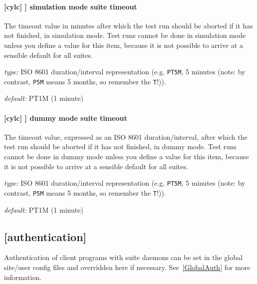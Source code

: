 \paragraph[simulation mode suite timeout]{[cylc] \textrightarrow [[reference test]] \textrightarrow simulation mode suite timeout}

The timeout value in minutes after which the test run should be aborted
if it has not finished, in simulation mode. Test runs cannot be done in
simulation mode unless you define a value for this item, because it is
not possible to arrive at a sensible default for all suites.

\begin{myitemize}
    \item {\em type:} ISO 8601 duration/interval representation (e.g.
 \lstinline=PT5M=, 5 minutes (note: by contrast, \lstinline=P5M= means 5
 months, so remember the \lstinline=T=!)).
    \item {\em default:} PT1M (1 minute)
\end{myitemize}

\paragraph[dummy mode suite timeout]{[cylc] \textrightarrow [[reference test]] \textrightarrow dummy mode suite timeout}

The timeout value, expressed as an ISO 8601 duration/interval, after which the
test run should be aborted if it has not finished, in dummy mode.  Test runs
cannot be done in dummy mode unless you define a value for this item, because
it is not possible to arrive at a sensible default for all suites.

\begin{myitemize}
    \item {\em type:} ISO 8601 duration/interval representation (e.g.
 \lstinline=PT5M=, 5 minutes (note: by contrast, \lstinline=P5M= means 5
 months, so remember the \lstinline=T=!)).
    \item {\em default:} PT1M (1 minute)
\end{myitemize}

\subsection{[authentication]}
\label{SuiteAuth}

Authentication of client programs with suite daemons can be set in the
global site/user config files and overridden here if necessary.
See~\ref{GlobalAuth} for more information.

